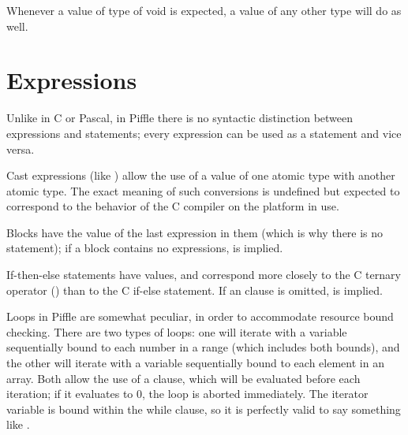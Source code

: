 \documentclass[a4paper,12pt]{scrreprt}
\begin{document}
Whenever a value of type of void is expected, a value of any other
type will do as well.

\section{Expressions}

Unlike in C or Pascal, in Piffle there is no syntactic distinction
between expressions and statements; every expression can be used as a
statement and vice versa.


Cast expressions (like ) allow the use of a value of one
atomic type with another atomic type. The exact meaning of such
conversions is undefined but expected to correspond to the behavior of
the C compiler on the platform in use.

Blocks have the value of the last expression in them (which is why
there is no  statement); if a block contains no
expressions,  is implied. 

If-then-else statements have values, and correspond more closely to
the C ternary operator () than to the C if-else statement. If
an  clause is omitted,  is implied.

Loops in Piffle are somewhat peculiar, in order to accommodate
resource bound checking. There are two types of loops: one will
iterate with a variable sequentially bound to each number in a range
(which includes both bounds), and the other will iterate with a
variable sequentially bound to each element in an array. Both allow
the use of a  clause, which will be evaluated before each
iteration; if it evaluates to 0, the loop is aborted immediately. The
iterator variable is bound within the while clause, so it is perfectly
valid to say something like .
\end{document}
